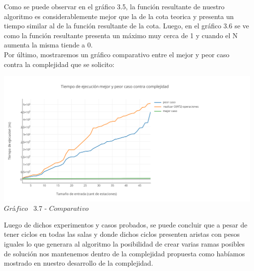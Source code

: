 Como se puede observar en el gr\'afico 3.5, la funci\'on resultante de nuestro algoritmo es considerablemente mejor que la de la cota teorica  y presenta un tiempo similar al de la funci\'on resultante de la cota.
Luego, en el gr\'afico 3.6 se ve como la función resultante presenta un m\'aximo muy cerca de 1 y cuando el N aumenta la misma tiende a 0.\\

Por \'ultimo, mostraremos un gr\'afico comparativo entre el mejor y peor caso contra la complejidad que se solicito:\\

\vspace*{0.3cm} \vspace*{0.3cm}
  \begin{center}
\includegraphics[scale=0.65]{./EJ3/comparativo1.png}
 {$Gr$\'a$fico$ \ 3.7 - $Comparativo$}
  \end{center}
  \vspace*{0.3cm}
  
Luego de dichos experimentos y casos probados, se puede concluir que a pesar de tener ciclos en todas las salas y donde dichos ciclos presenten aristas con pesos iguales lo que generara al algoritmo la posibilidad de crear varias ramas posibles de soluci\'on nos mantenemos dentro de la complejidad propuesta como hab\'iamos mostrado en nuestro desarrollo de la complejidad.\\
